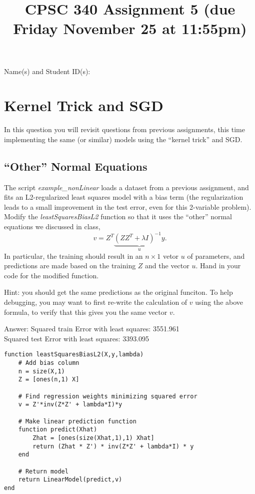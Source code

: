 \documentclass{article}
\def\ans#1{\par\gre{Answer: #1}}
\def\blu#1{{\color{blu}#1}}
\def\gre#1{{\color{gre}#1}}
\begin{document}
\title{CPSC 340 Assignment 5 (due Friday November 25 at 11:55pm)}
\author{}
\date{}
\maketitle
\vspace{-4em}


\blu{Name(s) and Student ID(s):}

\section{Kernel Trick and SGD}

In this question you will revisit questions from previous assignments, this time implementing the same (or similar) models using the ``kernel trick'' and SGD.

\subsection{``Other'' Normal Equations}

The script \emph{example\_nonLinear} loads a dataset from a previous assignment, and fits an L2-regularized least squares model with a bias term (the regularization leads to a small improvement in the test error, even for this 2-variable problem). Modify the \emph{leastSquaresBiasL2} function so that it uses the ``other'' normal equations we discussed in class,
\[
v = Z^T\underbrace{(ZZ^T + \lambda I)^{-1}y}_u.
\]
In particular, the training should result in an $n \times 1$ vetor $u$ of parameters, and predictions are made based on the training $Z$ and the vector $u$. \blu{Hand in your code for the modified function}.

Hint: you should get the same predictions as the original funciton. To help debugging, you may want to first re-write the calculation of $v$ using the above formula, to verify that this gives you the same vector $v$.

\ans{Squared train Error with least squares: 3551.961\\
Squared test Error with least squares: 3393.095}
\begin{lstlisting}
function leastSquaresBiasL2(X,y,lambda)
	# Add bias column
	n = size(X,1)
	Z = [ones(n,1) X]
	
	# Find regression weights minimizing squared error
	v = Z'*inv(Z*Z' + lambda*I)*y

	# Make linear prediction function
	function predict(Xhat)
		Zhat = [ones(size(Xhat,1),1) Xhat]
		return (Zhat * Z') * inv(Z*Z' + lambda*I) * y
	end

	# Return model
	return LinearModel(predict,v)
end
\end{lstlisting}
\end{document}
